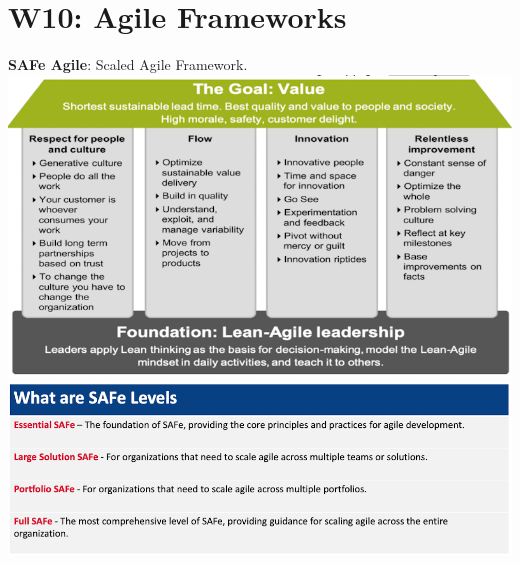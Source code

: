 \section{W10: Agile Frameworks}

\textbf{SAFe Agile}: Scaled Agile Framework.
\includegraphics[width=\linewidth]{figs/SCR-20240606-podj.png}
\includegraphics[width=\linewidth]{figs/SCR-20240606-prfh.png}

